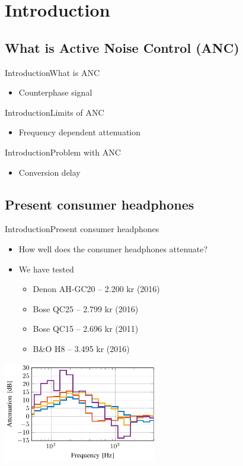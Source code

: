 \section{Introduction}
\subsection{What is Active Noise Control (ANC)}
\begin{frame}{Introduction}{What is ANC}		
	\begin{itemize}
		\item Counterphase signal
	\end{itemize}
\end{frame}
\begin{frame}{Introduction}{Limits of ANC}		
	\begin{itemize}
		\item Frequency dependent attenuation
	\end{itemize}
\end{frame}
\begin{frame}{Introduction}{Problem with ANC}		
	\begin{itemize}
		\item Conversion delay
	\end{itemize}
\end{frame}

\subsection{Present consumer headphones}
\begin{frame}{Introduction}{Present consumer headphones}		
	\begin{itemize}
		\item How well does the consumer headphones attenuate?
		\item We have tested
		\begin{itemize}
			\item Denon AH-GC20 -- 2.200 kr (2016)
			\item Bose QC25 	-- 2.799 kr (2016)
			\item Bose QC15 	-- 2.696 kr (2011)
			\item B\&O H8 		-- 3.495 kr (2016)
		\end{itemize}
	\end{itemize}
	\begin{center}
		\includegraphics[width=0.5\textwidth]{figures/ComparedConusmerHP}
	\end{center}	
\end{frame}





